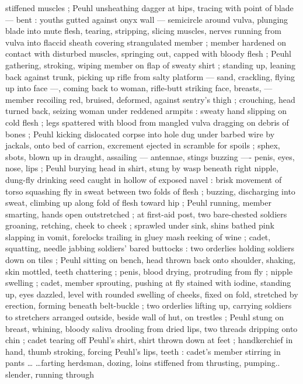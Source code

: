 \documentclass[10pt,twoside]{memoir}
\begin{document}
stiffened muscles ; Peuhl unsheathing dagger at hips, tracing with 
point of blade --- bent : youths gutted against onyx wall --- semicircle 
around vulva, plunging blade into mute flesh, tearing, 
stripping, slicing muscles, nerves running from vulva into flaccid 
sheath covering strangulated member ; member hardened on contact 
with disturbed muscles, springing out, capped with bloody flesh ; 
Peuhl gathering, stroking, wiping member on flap of sweaty shirt ; 
standing up, leaning back against trunk, picking up rifle from salty 
platform --- sand, crackling, flying up into face ---, coming back to 
woman, rifle-butt striking face, breasts, --- member recoiling red, 
bruised, deformed, against sentry's thigh ; crouching, head turned 
back, seizing woman under reddened armpits : sweaty hand slipping 
on cold flesh ; legs spattered with blood from mangled vulva 
dragging on debris of bones ; Peuhl kicking dislocated corpse into 
hole dug under barbed wire by jackals, onto bed of carrion, 
excrement ejected in scramble for spoils ; sphex, sbots, blown up in 
draught, assailing --- antennae, stings buzzing ---- penis, eyes, nose, 
lips ; Peuhl burying head in shirt, stung by wasp beneath right 
nipple, dung-fly drinking seed caught in hollow of exposed navel : 
brisk movement of torso squashing fly in sweat between two folds of 
flesh ; buzzing, discharging into sweat, climbing up along fold of 
flesh toward hip ; Peuhl running, member smarting, hands open 
outstretched ; at first-aid post, two bare-chested soldiers groaning, 
retching, cheek to cheek ; sprawled under sink, shins bathed pink 
slapping in vomit, forelocks trailing in gluey mash reeking of wine ; 
cadet, squatting, needle jabbing soldiers' bared buttocks : two 
orderlies holding soldiers down on tiles ; Peuhl sitting on bench, 
head thrown back onto shoulder, shaking, skin mottled, teeth 
chattering ; penis, blood drying, protruding from fly ; nipple swelling 
; cadet, member sprouting, pushing at fly stained with iodine, 
standing up, eyes dazzled, level with rounded swelling of cheeks, 
fixed on fold, stretched by erection, forming beneath belt-buckle ; 
two orderlies lifting up, carrying soldiers to stretchers arranged 
outside, beside wall of hut, on trestles ; Peuhl stung on breast, 
whining, bloody saliva drooling from dried lips, two threads dripping 
onto chin ; cadet tearing off Peuhl's shirt, shirt thrown down at feet 
; handkerchief in hand, thumb stroking, forcing Peuhl's lips, teeth : 
cadet's member stirring in pants \ldots {\guillemotleft} \ldots farting herdsman, dozing,
loins stiffened from thrusting, pumping.. slender, running through 
\end{document}
